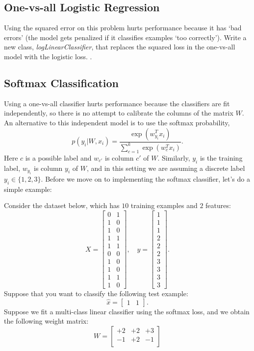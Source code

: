 \documentclass{article}
\begin{document}
\subsection{One-vs-all Logistic Regression}

Using the squared error on this problem hurts performance because it has `bad errors' (the model gets penalized if it classifies examples `too correctly'). 
Write a new class, \emph{logLinearClassifier}, that replaces the squared loss in the one-vs-all model with the logistic loss. .


\subsection{Softmax Classification}

Using a one-vs-all classifier hurts performance because the classifiers are fit independently, so there is no attempt to calibrate the columns of the matrix $W$. An alternative to this independent model is to use the softmax probability,
\[
p(y_i | W, x_i) = \frac{\exp(w_{y_i}^Tx_i)}{\sum_{c=1}^k\exp(w_c^Tx_i)}.
\]
Here $c$ is a possible label and $w_{c'}$ is column $c'$ of $W$. Similarly, $y_i$ is the training label, $w_{y_i}$ is column $y_i$ of $W$, and in this setting we are assuming a discrete label $y_i \in \{1,2,3\}$. Before we move on to implementing the softmax classifier, let's do a simple example:

Consider the dataset below, which has $10$ training examples and $2$ features:
\[
X = \begin{bmatrix}0 & 1\\1 & 0\\ 1 & 0\\ 1 & 1\\ 1 & 1\\ 0 & 0\\  1 & 0\\  1 & 0\\  1 & 1\\  1 &0\end{bmatrix}, \quad y = \begin{bmatrix}1\\1\\1\\2\\2\\2\\3\\3\\3\\3\end{bmatrix}.
\]
Suppose that you want to classify the following test example:
\[
\hat{x} = \begin{bmatrix}1 & 1\end{bmatrix}.
\]
Suppose we fit a multi-class linear classifier using the softmax loss, and we obtain the following weight matrix:
\[
W = 
\begin{bmatrix}
+2 & +2 & +3\\
-1 & +2 & -1\\
\end{bmatrix}
\]
\end{document}
